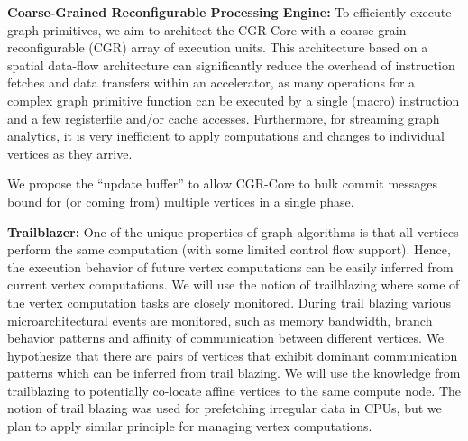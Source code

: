 %

\noindent
\textbf{Coarse-Grained Reconfigurable Processing Engine:} 
To efficiently execute graph primitives, we aim to architect the CGR-Core with a coarse-grain reconfigurable (CGR) array of execution units. 
This architecture based on a spatial data-flow architecture can significantly reduce the overhead of instruction fetches and data transfers within an accelerator, as many operations for a complex graph primitive function can be executed by a single (macro) instruction and a few registerfile and/or cache accesses. 
Furthermore, for streaming graph analytics, it is very inefficient to apply computations and changes to individual vertices as they arrive. 

We propose the “update buffer” to allow CGR-Core to bulk commit messages bound for (or coming from) multiple vertices in a single phase.

\noindent
\textbf{Trailblazer:} 
One of the unique properties of graph algorithms is that all vertices perform the same computation (with some limited control flow support). 
Hence, the execution behavior of future vertex computations can be easily inferred from current vertex computations. 
We will use the notion of trailblazing where some of the vertex computation tasks are closely monitored. 
During trail blazing various microarchitectural events are monitored, such as memory bandwidth, branch behavior patterns and affinity of communication between different vertices. 
We hypothesize that there are pairs of vertices that exhibit dominant communication patterns which can be inferred from trail blazing. 
We will use the knowledge from trailblazing to potentially co-locate affine vertices to the same compute node. 
The notion of trail blazing was used for prefetching irregular data in CPUs, but we plan to apply similar principle for managing vertex computations.
